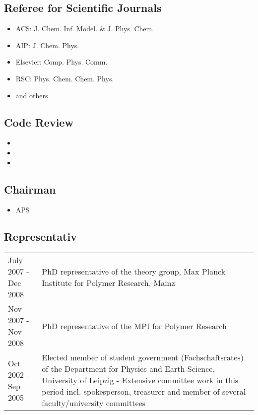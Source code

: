 \documentclass{article}
\begin{document}
\subsection*{Referee for Scientific Journals}

\begin{itemize}
\setlength{\itemsep}{0pt}
\setlength{\parskip}{0pt}
\setlength{\parsep}{0pt}
\item ACS: J. Chem. Inf. Model. \& J. Phys. Chem.
\item AIP: J. Chem. Phys.
\item Elsevier: Comp. Phys. Comm.
\item RSC: Phys. Chem. Chem. Phys.
\item and others
\end{itemize}

\subsection*{Code Review}

\begin{itemize}
\setlength{\itemsep}{0pt}
\setlength{\parskip}{0pt}
\setlength{\parsep}{0pt}
\item {}
\item {}
\item {}
\end{itemize}

\subsection*{Chairman}

\begin{itemize}
\setlength{\itemsep}{0pt}
\setlength{\parskip}{0pt}
\setlength{\parsep}{0pt}
\item APS 
\end{itemize}

\subsection*{Representativ}

\begin{tabular}{p{}p{}}
July 2007 - Dec 2008 & PhD representative of the theory group, Max Planck Institute for Polymer Research, Mainz \\
Nov 2007 - Nov 2008 & PhD representative of the MPI for Polymer Research \\
Oct 2002 - Sep 2005 & Elected member of student government (Fachschaftsrates) of the Department for Physics and Earth Science, University of Leipzig - Extensive committee work in this period incl. spokesperson, treasurer and member of several faculty/university committees \\
\end{tabular}
\end{document}
